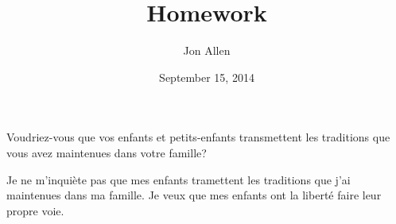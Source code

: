 \documentclass[letterpaper]{article}
\begin{document}
\title{Homework}
\date{September 15, 2014}
\author{Jon Allen}
\maketitle
Voudriez-vous que vos enfants et petits-enfants transmettent les traditions que vous avez maintenues dans votre famille?

Je ne m'inquiète pas que mes enfants tramettent les traditions que j'ai maintenues dans ma famille. Je veux que mes enfants ont la liberté faire leur propre voie.
\end{document}
